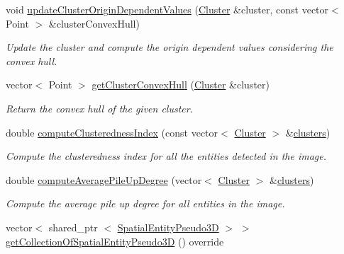 \begin{DoxyCompactItemize}
void \hyperlink{classmultiscale_1_1analysis_1_1ClusterDetector_ac7e008a7674205095f94b91c8d7cdccc}{update\-Cluster\-Origin\-Dependent\-Values} (\hyperlink{classmultiscale_1_1analysis_1_1Cluster}{\-Cluster} \&cluster, const vector$<$ \-Point $>$ \&cluster\-Convex\-Hull)
\begin{DoxyCompactList}\small\item\em \-Update the cluster and compute the origin dependent values considering the convex hull. \end{DoxyCompactList}\item 
vector$<$ \-Point $>$ \hyperlink{classmultiscale_1_1analysis_1_1ClusterDetector_a4a071efa7d7812c1db9ee577b7893902}{get\-Cluster\-Convex\-Hull} (\hyperlink{classmultiscale_1_1analysis_1_1Cluster}{\-Cluster} \&cluster)
\begin{DoxyCompactList}\small\item\em \-Return the convex hull of the given cluster. \end{DoxyCompactList}\item 
double \hyperlink{classmultiscale_1_1analysis_1_1ClusterDetector_aaa7937daf9872614e09b23cb4f6e5aa8}{compute\-Clusteredness\-Index} (const vector$<$ \hyperlink{classmultiscale_1_1analysis_1_1Cluster}{\-Cluster} $>$ \&\hyperlink{classmultiscale_1_1analysis_1_1ClusterDetector_aa81a8649bc743389c2fc1919d47eb5b3}{clusters})
\begin{DoxyCompactList}\small\item\em \-Compute the clusteredness index for all the entities detected in the image. \end{DoxyCompactList}\item 
double \hyperlink{classmultiscale_1_1analysis_1_1ClusterDetector_a1efab8446c79feb8a9285d895bb64b05}{compute\-Average\-Pile\-Up\-Degree} (vector$<$ \hyperlink{classmultiscale_1_1analysis_1_1Cluster}{\-Cluster} $>$ \&\hyperlink{classmultiscale_1_1analysis_1_1ClusterDetector_aa81a8649bc743389c2fc1919d47eb5b3}{clusters})
\begin{DoxyCompactList}\small\item\em \-Compute the average pile up degree for all entities in the image. \end{DoxyCompactList}\item 
vector$<$ shared\-\_\-ptr\*
$<$ \hyperlink{classmultiscale_1_1analysis_1_1SpatialEntityPseudo3D}{\-Spatial\-Entity\-Pseudo3\-D} $>$ $>$ \hyperlink{classmultiscale_1_1analysis_1_1ClusterDetector_a6bf0ac91b81cdcf46fe8e50f6dd4c9a8}{get\-Collection\-Of\-Spatial\-Entity\-Pseudo3\-D} () override

\end{DoxyCompactItemize}

